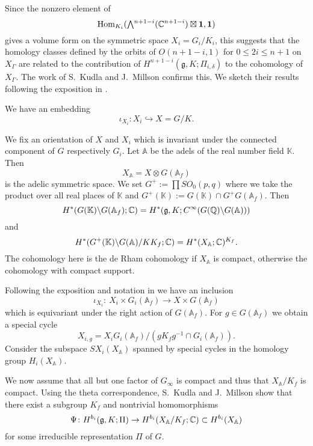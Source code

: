 Since the nonzero element of 
\[
   {\operatorname{Hom}}_{K_i}
   (\Exterior^{n+1-i}({{\mathbb C}^{n+1-i})\boxtimes {\bf{1}}, {\mathbf 1}})
\]
 gives a volume form on the symmetric space $X_i=G_i/K_i$, 
 this suggests
 that the homology classes defined
 by the orbits of $O(n+1-i,1)$
 for $0 \le 2i \leq n+1$ on $X_\Gamma$ are related
 to the contribution of $H^{n+1-i}({\mathfrak{g}},K;\Pi_{i,\delta})$
 to the cohomology of $X_\Gamma$.  
The work of S.~Kudla and J.~Millson confirms this.
We sketch their results   following the exposition in \cite{KM2, KM-I, KM-II}.



We have an embedding 
\[ 
     \iota_{X_i }: X_i \hookrightarrow X=G/K.   
\]
            
We fix an orientation of $X$ and $X_i$
 which is invariant under the connected component of $G$ respectively $G_i$.    Let $\mathbb A$ be the adels of the real number field $\mathbb K.$  
Then
\[ 
     X_{\mathbb A} = X \otimes G(\mathbb A_f) 
\]  
is the adelic  symmetric space. 
We set $G^+:= \prod SO_0(p,q)$ where we take the product over all real places
 of $\mathbb K $ and 
 $G^+(\mathbb K) := G(\mathbb K) \cap G^+G(\mathbb A_f)$.  
Then
 \[ H^*(G(\mathbb K) \backslash G(\mathbb A_f);{\mathbb C}) = H^*({\mathfrak
 g},K; C^\infty(G(\mathbb Q)\backslash G(\mathbb A) ))\]
and 
\[
   H^*(G^+(\mathbb K)\backslash G(\mathbb A) /KK_f;{\mathbb C})
  =H^*(X_\mathbb A; \mathbb C)^{K_f}.  
\]
The cohomology here is the de Rham cohomology if  $X_\mathbb A$ is compact,
 otherwise the cohomology with compact support.


Following the exposition and notation in \cite[Sect.~2]{KM-II}
 we have an inclusion
\[
 \iota_{X_i} : \ X_i \times G_i(\mathbb A_f) \rightarrow X \times G({\mathbb A}_f)
\]
which is equivariant under the right action of $G({\mathbb A}_f)$. 
For $g \in G({\mathbb A}_f)$ we obtain a special cycle   
\[
     X_{i,g} = X_i G_i(\mathbb A_f) / (gK_f g^{-1} \cap G_i({\mathbb A}_f)).
\]
Consider the subspace $SX_i(X_{\mathbb A})$  spanned by special cycles
 in the homology group $H_i(X_{\mathbb A})$. 

 
\medskip
We now assume that all but one factor of $G_\infty $ is compact and thus that $X_{\mathbb A}/K_f$ is compact.
Using the theta correspondence,
 S.~Kudla and J.~Millson show that there exist a subgroup $K_f$ and  nontrivial homomorphisms 
\[ 
\Psi \colon H^{b_i}({\mathfrak g},K; \Pi) 
            \rightarrow H^{b_i}(X_{\mathbb A}/K_f;{\mathbb C}) \subset H^{b_i}(X_{\mathbb A})
\]
for some irreducible representation $\Pi$ of $G$.  

